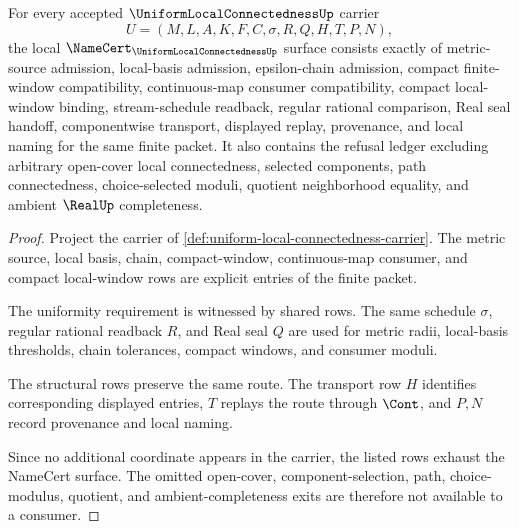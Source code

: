 \begin{theorem}
\label{thm:uniform-local-connectedness-namecert-obligations}
For every accepted $\UniformLocalConnectednessUp$ carrier
$$
U=(M,L,A,K,F,C,\sigma,R,Q,H,T,P,N),
$$
the local $\NameCert_{\UniformLocalConnectednessUp}$ surface consists exactly of metric-source admission, local-basis admission, epsilon-chain admission, compact finite-window compatibility, continuous-map consumer compatibility, compact local-window binding, stream-schedule readback, regular rational comparison, Real seal handoff, componentwise transport, displayed replay, provenance, and local naming for the same finite packet. It also contains the refusal ledger excluding arbitrary open-cover local connectedness, selected components, path connectedness, choice-selected moduli, quotient neighborhood equality, and ambient $\RealUp$ completeness.
\end{theorem}
\begin{proof}
Project the carrier of \autoref{def:uniform-local-connectedness-carrier}. The metric source, local basis, chain, compact-window, continuous-map consumer, and compact local-window rows are explicit entries of the finite packet.

The uniformity requirement is witnessed by shared rows. The same schedule $\sigma$, regular rational readback $R$, and Real seal $Q$ are used for metric radii, local-basis thresholds, chain tolerances, compact windows, and consumer moduli.

The structural rows preserve the same route. The transport row $H$ identifies corresponding displayed entries, $T$ replays the route through $\Cont$, and $P,N$ record provenance and local naming.

Since no additional coordinate appears in the carrier, the listed rows exhaust the NameCert surface. The omitted open-cover, component-selection, path, choice-modulus, quotient, and ambient-completeness exits are therefore not available to a consumer.
\end{proof}

